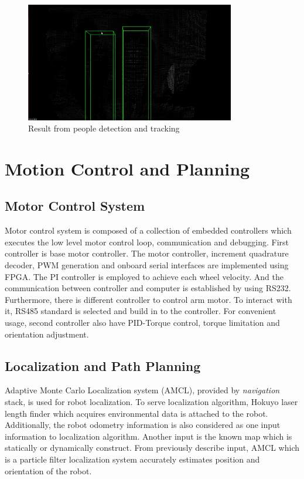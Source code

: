 \documentclass{llncs}
\begin{document}
\begin{figure}
\centering
\includegraphics[height=5.2cm]{people_detection_figure}
\caption{Result from people detection and tracking}
\label{fig:people_detection}
\end{figure}

\section{Motion Control and Planning}

\subsection{Motor Control System}

Motor control system is composed of a collection of embedded controllers which executes the low level motor control loop, communication and debugging. First controller is base motor controller. The motor controller, increment quadrature decoder, PWM generation and onboard serial interfaces are implemented using FPGA. The PI controller is employed to achieve each wheel velocity. And the communication between controller and computer is established by using RS232. Furthermore, there is different controller to control arm motor. To interact with it, RS485 standard is selected and build in to the controller. For convenient usage, second controller also have PID-Torque control, torque limitation and orientation adjustment. 

\subsection{Localization and Path Planning}

Adaptive Monte Carlo Localization system (AMCL), provided by \textit{navigation} stack, is used for robot localization. To serve localization algorithm, Hokuyo laser length finder which acquires environmental data is attached to the robot. Additionally, the robot odometry information is also considered as one input information to localization algorithm. Another input is the known map which is statically or dynamically construct. From previously describe input, AMCL which is a particle filter localization system accurately estimates position and orientation of the robot.
\end{document}
